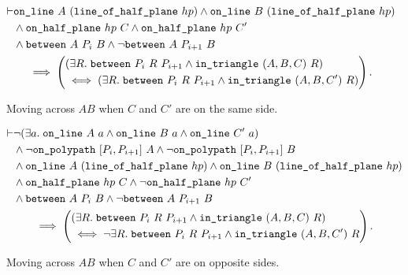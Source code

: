 \begin{figure}
\begin{multline}\label{eq:crossChangeLemma1}
  \begin{aligned}
    \vdash&\texttt{on\_line}\ A\ (\texttt{line\_of\_half\_plane}\ hp) \wedge \texttt{on\_line}\ B\ (\texttt{line\_of\_half\_plane}\ hp)\\
    &\wedge\texttt{on\_half\_plane}\ hp\ C \wedge \texttt{on\_half\_plane}\ hp\ C'\\
    &\wedge\texttt{between}\ A\ P_i\ B \wedge \neg\texttt{between}\ A\ P_{i+1}\ B
  \end{aligned}\\
  \implies\left(\begin{aligned} 
      &(\exists R.\; \texttt{between}\ P_i\ R\ P_{i+1} \wedge \texttt{in\_triangle}\ (A,B,C)\ R)\\
      & \iff (\exists R.\; \texttt{between}\ P_i\ R\ P_{i+1} \wedge \texttt{in\_triangle}\ (A,B,C')\ R)
  \end{aligned}\right).
\end{multline}
\caption{Moving across $AB$ when $C$ and $C'$ are on the same side.}
\label{fig:crossChangeLemma1}
\end{figure}

\begin{figure}
\begin{multline}\label{eq:crossChangeLemma2}
  \begin{aligned}
    \vdash&\neg(\exists a.\; \texttt{on\_line}\ A\ a\wedge \texttt{on\_line}\ B\ a\wedge \texttt{on\_line}\ C'\ a)\\
    &\wedge \neg\texttt{on\_polypath}\ [P_i, P_{i+1}]\ A \wedge \neg\texttt{on\_polypath}\ [P_i, P_{i+1}]\ B\\
    &\wedge\texttt{on\_line}\ A\ (\texttt{line\_of\_half\_plane}\ hp) \wedge \texttt{on\_line}\ B\ (\texttt{line\_of\_half\_plane}\ hp)\\
    &\wedge\texttt{on\_half\_plane}\ hp\ C \wedge \neg\texttt{on\_half\_plane}\ hp\ C'\\
    &\wedge \texttt{between}\ A\ P_i\ B \wedge \neg\texttt{between}\ A\ P_{i+1}\ B
  \end{aligned}\\
  \implies\left(\begin{aligned}
      &(\exists R.\; \texttt{between}\ P_i\ R\ P_{i+1} \wedge \texttt{in\_triangle}\ (A,B,C)\ R)\\
      &\iff\neg \exists R.\; \texttt{between}\ P_i\ R\ P_{i+1} \wedge \texttt{in\_triangle}\ (A,B,C')\ R
  \end{aligned}\right).
\end{multline}
\caption{Moving across $AB$ when $C$ and $C'$ are on opposite sides.}
\label{fig:crossChangeLemma2}
\end{figure}

